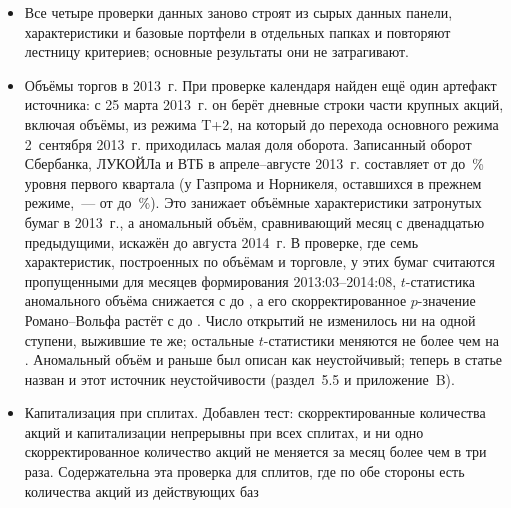\documentclass[11pt]{article}
\newcommand{\RW}{Романо--Вольфа}
\begin{document}
\begin{itemize}
(T0) и 10~апреля 2013~г. (T+2). В двух дополнительных проверках все даты этого источника сдвинуты на две сессии раньше и
на две сессии позже. Месячная доходность меняется в  и  наблюдениях U100
соответственно, в основном слабо (через цену, по которой реинвестируется выплата), а в нескольких случаях~--- из-за
переноса крупной выплаты в соседний месяц. Число открытий не изменилось ни на одной ступени лестницы, выжившие те же;
$t$-статистики выживших меняются не более чем на ; наибольшее изменение ()
приходится на характеристику , у которой базовое значение $t$ равно .
\item Все четыре проверки данных заново строят из сырых данных панели, характеристики и базовые портфели в отдельных
папках и повторяют лестницу критериев; основные результаты они не затрагивают.
\item Объёмы торгов в 2013~г. При проверке календаря найден ещё один артефакт источника: с 25 марта 2013~г. он берёт
дневные строки части крупных акций, включая объёмы, из режима T+2, на который до перехода основного режима
2~сентября 2013~г. приходилась малая доля оборота. Записанный оборот Сбербанка, ЛУКОЙЛа и ВТБ в апреле--августе 2013~г.
составляет от  до \,\% уровня первого квартала (у Газпрома и Норникеля, оставшихся в
прежнем режиме,~--- от  до \,\%). Это занижает объёмные характеристики 
затронутых бумаг в 2013~г., а аномальный объём, сравнивающий месяц с двенадцатью предыдущими, искажён до августа 2014~г.
В проверке, где семь характеристик, построенных по объёмам и торговле, у этих бумаг считаются пропущенными для месяцев
формирования 2013:03--2014:08, $t$-статистика аномального объёма снижается с  до , а его
скорректированное $p$-значение \RW{} растёт с  до . Число открытий не изменилось ни на
одной ступени, выжившие те же; остальные $t$-статистики меняются не более чем на . Аномальный объём и раньше был
описан как неустойчивый; теперь в статье назван и этот источник неустойчивости (раздел~5.5 и приложение~B).
\item Капитализация при сплитах. Добавлен тест: скорректированные количества акций и капитализации непрерывны при всех
 сплитах, и ни одно скорректированное количество акций не меняется за месяц более чем в три раза.
Содержательна эта проверка для  сплитов, где по обе стороны есть количества акций из действующих баз

\end{itemize}
\end{document}
